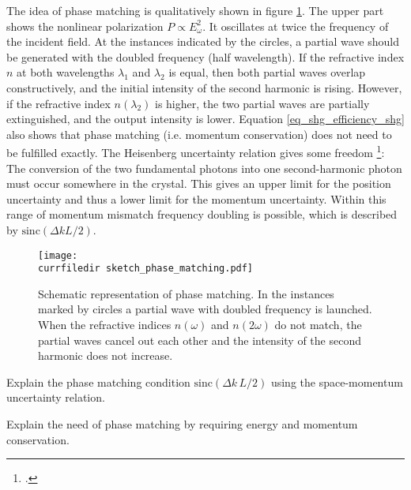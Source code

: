 The idea of phase matching is qualitatively shown in figure
\ref{fig:shg_phase_matching}. The upper part shows the nonlinear 
polarization $P \propto E_{\omega}^2$. It oscillates
at twice the frequency of the incident field. At the instances indicated by the circles,  a partial wave should  be generated with
the doubled frequency (half wavelength). If the
refractive index $n$ at both wavelengths $\lambda_1$ and
$\lambda_2$ is equal, then both partial waves overlap
constructively, and the initial intensity of the second harmonic
is rising. However, if the refractive index $n(\lambda_2)$ is higher,
the two partial waves are partially extinguished, and the
output intensity is lower. Equation
\ref{eq_shg_efficiency_shg} also shows that 
phase matching (i.e. momentum conservation) does not need to be fulfilled  exactly.  The Heisenberg uncertainty relation gives some freedom
\footcite{Demtroeder_laser,SalehTeich1991}:
The conversion of the two fundamental photons into one second-harmonic photon 
must occur somewhere in the crystal. This gives an upper limit for  the position uncertainty and thus a lower limit for the momentum uncertainty.
Within  this  range of momentum mismatch frequency doubling  is possible, which is described by $\text{sinc}(\Delta k L/2)$.




\begin{figure}
\center
\texttt{[image: \\currfiledir sketch\_phase\_matching.pdf]}
\caption{Schematic representation of 
phase matching.
In the instances marked by circles a
partial wave with doubled frequency is launched. When the
refractive indices $n(\omega)$ and $n(2 \omega)$ do not
match, the partial waves cancel out each other  and
the intensity of the second harmonic does not increase.}
\label{fig:shg_phase_matching}
\end{figure}


\begin{questions}

\item Explain the phase matching condition $\text{sinc} ( \Delta k \, L /2 )$ using the space-momentum uncertainty relation.

\item Explain the need of phase matching by requiring energy and momentum conservation.

\end{questions}


